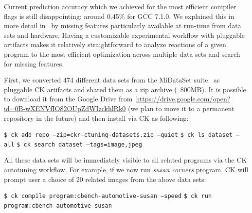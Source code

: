 Current prediction accuracy which we achieved for the most efficient compiler flags 
is still disappointing: around 0.45\% for GCC 7.1.0.
%
We explained this in more detail in~\cite{cm:29db2248aba45e59:cd11e3a188574d80,fursin:hal-01054763}
by missing features particularly available at run-time from data sets and hardware.
%
Having a customizable experimental workflow with pluggable artifacts 
makes it relatively straightforward to analyze reactions of a given program
to the most efficient optimization across multiple data sets
and search for missing features.

First, we converted 474 different data sets from the MiDataSet suite~\cite{FCOP2007}
as pluggable CK artifacts and shared them as a zip archive (~800MB).
%
It is possible to download it from the Google Drive
from~\url{https://drive.google.com/open?id=0B-wXENVfIO82OUpZdWIzckhlRk0}
(we plan to move it to a permanent repository in the future)
and then install via CK as following:

\begin{flushleft}
\texttt{\$ ck add repo --zip=ckr-ctuning-datasets.zip --quiet}\newline
\texttt{\$ ck ls dataset --all}\newline
\texttt{\$ ck search dataset --tags=image,jpeg}\newline
\end{flushleft}

All these data sets will be immediately visible to all related programs
via the CK autotuning workflow.
%
For example, if we now run \textit{susan corners} program, CK will prompt user
a choice of 20 related images from the above data sets:

\begin{flushleft}
\texttt{\$ ck compile program:cbench-automotive-susan --speed}\newline
\texttt{\$ ck run program:cbench-automotive-susan}\newline
\end{flushleft}

